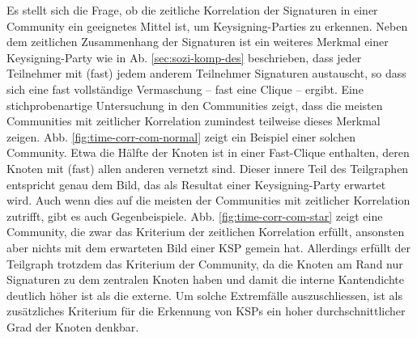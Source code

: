 Es stellt sich die Frage, ob die zeitliche Korrelation der Signaturen
in einer Community ein geeignetes Mittel ist, um Keysigning-Parties zu
erkennen. Neben dem zeitlichen Zusammenhang der Signaturen ist ein
weiteres Merkmal einer Keysigning-Party wie in
Ab. \ref{sec:sozi-komp-des} beschrieben, dass jeder Teilnehmer mit
(fast) jedem anderem Teilnehmer Signaturen austauscht, so dass sich
eine fast vollst\"andige Vermaschung -- fast eine Clique --
ergibt. Eine stichprobenartige Untersuchung in den Communities zeigt,
dass die meisten Communities mit zeitlicher Korrelation zumindest
teilweise dieses Merkmal zeigen. Abb. \ref{fig:time-corr-com-normal}
zeigt ein Beispiel einer solchen Community. Etwa die H\"alfte der
Knoten ist in einer Fast-Clique enthalten, deren Knoten mit (fast)
allen anderen vernetzt sind. Dieser innere Teil des Teilgraphen
entspricht genau dem Bild, das als Resultat einer Keysigning-Party
erwartet wird. Auch wenn dies auf die meisten der Communities mit
zeitlicher Korrelation zutrifft, gibt es auch
Gegenbeispiele. Abb. \ref{fig:time-corr-com-star} zeigt eine
Community, die zwar das Kriterium der zeitlichen Korrelation
erf\"ullt, ansonsten aber nichts mit dem erwarteten Bild einer KSP
gemein hat. Allerdings erf\"ullt der Teilgraph trotzdem das Kriterium
der Community, da die Knoten am Rand nur Signaturen zu dem zentralen
Knoten haben und damit die interne Kantendichte deutlich h\"oher ist
als die externe. Um solche Extremf\"alle auszuschliessen, ist als
zus\"atzliches Kriterium f\"ur die Erkennung von KSPs ein hoher
durchschnittlicher Grad der Knoten denkbar.


